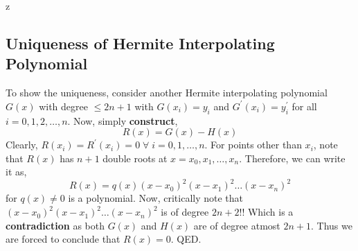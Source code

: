 z\documentclass[a4paper,12pt,twoside]{book}
\newcommand{\nll}[0]{\newline\newline}
\begin{document}
\subsection{Uniqueness of Hermite Interpolating Polynomial}
To show the uniqueness, consider another Hermite interpolating polynomial $G(x)$ with degree $\le 2n+1$ with $G(x_i) = y_i$ and $G^\prime(x_i)= y_i^\prime$ for all $i  = 0,1,2,\dots,n$. 
\nll
Now, simply \textbf{construct},
\[R(x) = G(x) - H(x)\]
Clearly, $R(x_i) = R^\prime(x_i) = 0 \;\forall\;i=0,1,\dots,n$.
\nll
For points other than $x_i$, note that $R(x)$ has $n+1$ double roots at $x=x_0,x_1,\dots,x_n$. Therefore, we can write it as,
\[R(x) = q(x) (x-x_0)^2(x-x_1)^2\dots(x-x_n)^2\]
for $q(x)\neq 0$ is a polynomial.
\nll
Now, critically note that $(x-x_0)^2(x-x_1)^2\dots(x-x_n)^2$ is of degree $2n+2$!! Which is a \textbf{contradiction} as both $G(x)$ and $H(x)$ are of degree atmost $2n+1$.
\nll
Thus we are forced to conclude that $R(x) = 0$. QED.
\end{document}
